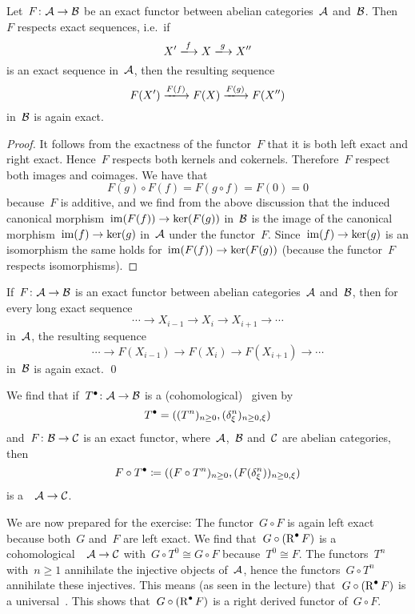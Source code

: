 \section{}





\begin{lemma}
  Let~$F \colon \mathcal{A} \to \mathcal{B}$ be an exact functor between abelian categories~$\mathcal{A}$ and~$\mathcal{B}$.
  Then~$F$ respects exact sequences, i.e.\ if
  \[
    X'
    \xlongto{f}
    X
    \xlongto{g}
    X''
  \]
  is an exact sequence in~$\mathcal{A}$, then the resulting sequence
  \[
    F(X')
    \xlongto{F(f)}
    F(X)
    \xlongto{F(g)}
    F(X'')
  \]
  in~$\mathcal{B}$ is again exact.
\end{lemma}


\begin{proof}
  It follows from the exactness of the functor~$F$ that it is both left exact and right exact.
  Hence~$F$ respects both kernels and cokernels.
  Therefore~$F$ respect both images and coimages.
  We have that
  \[
      F(g) \circ F(f)
    = F(g \circ f)
    = F(0)
    = 0
  \]
  because~$F$ is additive, and we find from the above discussion that the induced canonical morphism~$\operatorname{im}(F(f)) \to \ker(F(g))$ in~$\mathcal{B}$ is the image of the canonical morphism~$\operatorname{im}(f) \to \ker(g)$ in~$\mathcal{A}$ under the functor~$F$.
  Since~$\operatorname{im}(f) \to \ker(g)$ is an isomorphism the same holds for~$\operatorname{im}(F(f)) \to \ker(F(g))$ (because the functor~$F$ respects isomorphisms).
\end{proof}


\begin{corollary}
  If~$F \colon \mathcal{A} \to \mathcal{B}$ is an exact functor between abelian categories~$\mathcal{A}$ and~$\mathcal{B}$, then for every long exact sequence
  \[
    \dotsb
    \to
    X_{i-1}
    \to
    X_i
    \to
    X_{i+1}
    \to
    \dotsb
  \]
  in~$\mathcal{A}$, the resulting sequence
  \[
    \dotsb
    \to
    F(X_{i-1})
    \to
    F(X_i)
    \to
    F(X_{i+1})
    \to
    \dotsb
  \]
  in~$\mathcal{B}$ is again exact.
  \qed
\end{corollary}

We find that if~$T^\bullet \colon \mathcal{A} \to \mathcal{B}$ is a (cohomological)~{\deltafun} given by
\[
  T^\bullet
  =
  ( (T^n)_{n \geq 0}, (\delta^n_\xi)_{n \geq 0, \xi} )
\]
and~$F \colon \mathcal{B} \to \mathcal{C}$ is an exact functor, where~$\mathcal{A}$,~$\mathcal{B}$ and~$\mathcal{C}$ are abelian categories, then
\[
  F \circ T^\bullet
  \coloneqq
  ( (F \circ T^n)_{n \geq 0}, (F(\delta^n_\xi))_{n \geq 0, \xi} )
\]
is a~{\deltafun}~$\mathcal{A} \to \mathcal{C}$.

We are now prepared for the exercise:
The functor~$G \circ F$ is again left exact because both~$G$ and~$F$ are left exact.
We find that~$G \circ (\operatorname{R}^\bullet F)$ is a cohomological~{\deltafun}~$\mathcal{A} \to \mathcal{C}$ with~$G \circ T^0 \cong G \circ F$ because~$T^0 \cong F$.
The functors~$T^n$ with~$n \geq 1$ annihilate the injective objects of~$\mathcal{A}$, hence the functors~$G \circ T^n$ annihilate these injectives.
This means (as seen in the lecture) that~$G \circ (\operatorname{R}^\bullet F)$ is a universal~{\deltafun}.
This shows that~$G \circ (\operatorname{R}^\bullet F)$ is a right derived functor of~$G \circ F$.





